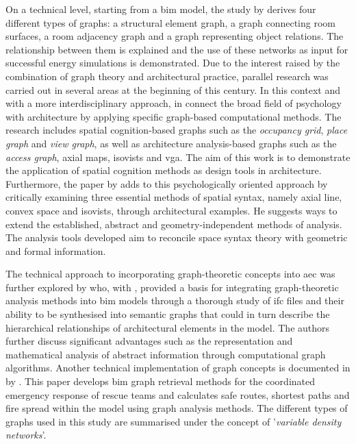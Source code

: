 \documentclass[a4paper, 12pt]{report}
\begin{document}
On a technical level, starting from a \acrshort{bim} model, the study  by \citeauthor{van2004analysis} derives four different types of graphs: a structural element graph, a graph connecting room surfaces, a room adjacency graph and a graph representing object relations. The relationship between them is explained and the use of these networks as input for successful energy simulations is demonstrated. Due to the interest raised by the combination of graph theory and architectural practice, parallel research was carried out in several areas at the beginning of this century. In this context and with a more interdisciplinary approach, \citeauthor{franz2005graph} in  connect the broad field of psychology with architecture by applying specific graph-based computational methods. The research includes spatial cognition-based graphs such as the \textit{occupancy grid}, \textit{place graph} and \textit{view graph}, as well as architecture analysis-based graphs such as the \textit{access graph}, \glspl{axial map}, \glspl{isovist} and \acrlong{vga}. The aim of this work is to demonstrate the application of spatial cognition methods as design tools in architecture. Furthermore, the paper  by \citeauthor{dawes2013applications} adds to this psychologically oriented approach by critically examining three essential methods of spatial syntax, namely axial line, convex space and \glspl{isovist}, through architectural examples. He suggests ways to extend the established, abstract and geometry-independent methods of analysis. The analysis tools developed aim to reconcile space syntax theory with geometric and formal information.

The technical approach to incorporating graph-theoretic concepts into \acrshort{aec} was further explored by \citeauthor{isaac2013analyzing} who, with , provided a basis for integrating graph-theoretic analysis methods into \acrshort{bim} models through a thorough study of \acrshort{ifc} files and their ability to be synthesised into semantic graphs that could in turn describe the hierarchical relationships of architectural elements in the model. The authors further discuss significant advantages such as the representation and mathematical analysis of abstract information through computational graph algorithms. Another technical implementation of graph concepts is documented in  by \citeauthor{boguslawski2016two}. This paper develops \acrshort{bim} graph retrieval methods for the coordinated emergency response of rescue teams and calculates safe routes, shortest paths and fire spread within the model using graph analysis methods. The different types of graphs used in this study are summarised under the concept of '\textit{variable density networks}'.
\end{document}
